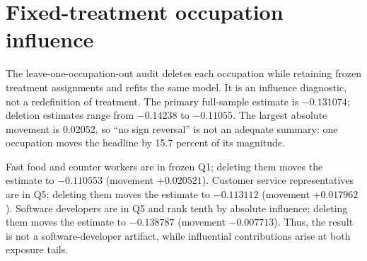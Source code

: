 \section{Fixed-treatment occupation influence}\label{app:loco}

The leave-one-occupation-out audit deletes each occupation while retaining frozen treatment assignments and refits the same model. It is an influence diagnostic, not a redefinition of treatment. The primary full-sample estimate is $-0.131074$; deletion estimates range from $-0.14238$ to $-0.11055$. The largest absolute movement is 0.02052, so ``no sign reversal'' is not an adequate summary: one occupation moves the headline by 15.7 percent of its magnitude.

Fast food and counter workers are in frozen Q1; deleting them moves the estimate to $-0.110553$ (movement $+0.020521$). Customer service representatives are in Q5; deleting them moves the estimate to $-0.113112$ (movement $+0.017962$). Software developers are in Q5 and rank tenth by absolute influence; deleting them moves the estimate to $-0.138787$ (movement $-0.007713$). Thus, the result is not a software-developer artifact, while influential contributions arise at both exposure tails.

